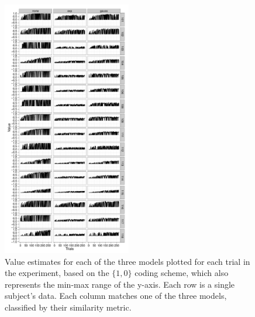 \begin{figure}[tp]
    \includegraphics[width=0.5\textwidth]{f_value_acc}
    \centering    
    \caption{Value estimates for each of the three models plotted for each trial in the experiment, based on the $\{1,0\}$ coding scheme, which also represents the min-max range of the y-axis.  Each row is a single subject's data.  Each column matches one of the three models, classified by their similarity metric.}
    \label{fig:valueacc}
\end{figure}
